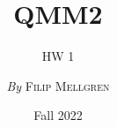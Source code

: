 

\title{QMM2}
\subtitle{HW 1}
\author{\textit{By} \textsc{Filip Mellgren}}
\date{Fall 2022}


	
	\maketitle
	
	
	
	

